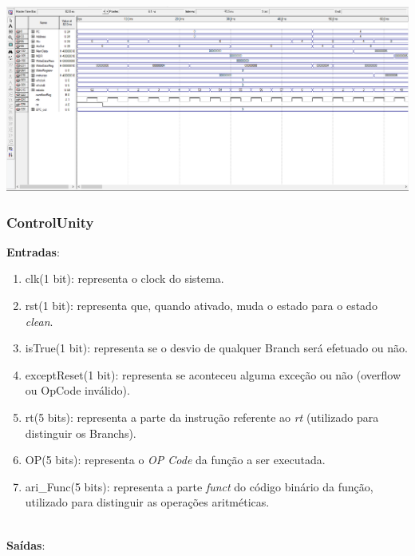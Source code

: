 \documentclass{article}
\begin{document}
    \begin{center}
        \includegraphics[scale=0.3]{MultCycleProcessor.PNG}
    \end{center}
    
    \newpage
    \subsubsection{ControlUnity}
    \textbf{Entradas}:
    \begin{enumerate}
         \item clk(1 bit): representa o clock do sistema.
         \item rst(1 bit): representa que, quando ativado, muda o estado para o estado {\it clean}.
         \item isTrue(1 bit): representa se o desvio de qualquer Branch será efetuado ou não.
         \item exceptReset(1 bit): representa se aconteceu alguma exceção ou não (overflow ou OpCode inválido).
         \item rt(5 bits): representa a parte da instrução referente ao {\it rt} (utilizado para distinguir os Branchs).
         \item OP(5 bits): representa o {\it OP Code} da função a ser executada.
         \item ari\_Func(5 bits): representa a parte {\it funct} do código binário da função, utilizado para distinguir as operações aritméticas.\\
    \end{enumerate}
\\
    \textbf{Saídas}:
\end{document}
